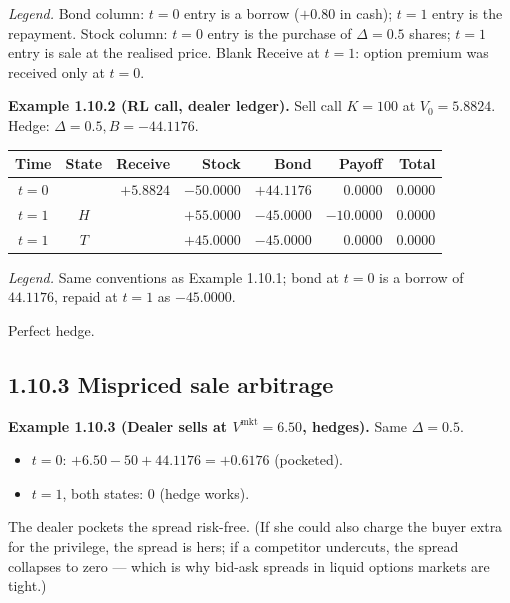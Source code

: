 \documentclass[
  10pt,
  twoside]{book}
\newcounter{none} %
\providecommand{\tightlist}{%
  \setlength{\itemsep}{0pt}\setlength{\parskip}{0pt}}
\begin{document}
\emph{Legend.} Bond column: \(t=0\) entry is a borrow (\(+0.80\) in
cash); \(t=1\) entry is the repayment. Stock column: \(t=0\) entry is
the purchase of \(\Delta = 0.5\) shares; \(t=1\) entry is sale at the
realised price. Blank Receive at \(t=1\): option premium was received
only at \(t=0\).

\textbf{Example 1.10.2 (RL call, dealer ledger).} Sell call \(K=100\) at
\(V_0=5.8824\). Hedge: \(\Delta=0.5, B=-44.1176\).

{\def\LTcaptype{none} %
\begin{table}[H]
\centering
\begin{tabular}{|c|c|r|r|r|r|r|}
\toprule
Time & State & Receive & Stock & Bond & Payoff & Total \\
\midrule



\(t=0\) & & \(+5.8824\) & \(-50.0000\) & \(+44.1176\) & \(0.0000\) &
\(\mathbf{0.0000}\) \\
\(t=1\) & \(H\) & & \(+55.0000\) & \(-45.0000\) & \(-10.0000\) &
\(\mathbf{0.0000}\) \\
\(t=1\) & \(T\) & & \(+45.0000\) & \(-45.0000\) & \(0.0000\) &
\(\mathbf{0.0000}\) \\
\bottomrule
\end{tabular}
\end{table}
}

\emph{Legend.} Same conventions as Example 1.10.1; bond at \(t=0\) is a
borrow of \(44.1176\), repaid at \(t=1\) as \(-45.0000\).

Perfect hedge.

\subsection{1.10.3 Mispriced sale
arbitrage}\label{mispriced-sale-arbitrage}

\textbf{Example 1.10.3 (Dealer sells at \(V^{\text{mkt}}=6.50\),
hedges).} Same \(\Delta=0.5\).

\begin{itemize}
\tightlist
\item
  \(t=0\): \(+6.50 - 50 + 44.1176 = +0.6176\) (pocketed).
\item
  \(t=1\), both states: \(0\) (hedge works).
\end{itemize}

The dealer pockets the spread risk-free. (If she could also charge the
buyer extra for the privilege, the spread is hers; if a competitor
undercuts, the spread collapses to zero --- which is why bid-ask spreads
in liquid options markets are tight.)
\end{document}
